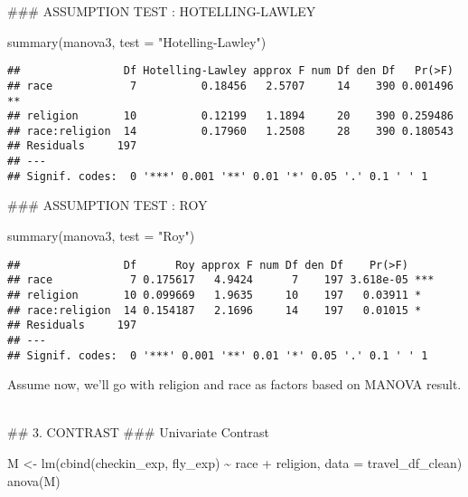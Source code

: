 \documentclass[
]{article}
\newenvironment{Shaded}{\begin{snugshade}}{\end{snugshade}}
\newcommand{\AttributeTok}[1]{\textcolor[rgb]{0.77,0.63,0.00}{#1}}
\newcommand{\FunctionTok}[1]{\textcolor[rgb]{0.00,0.00,0.00}{#1}}
\newcommand{\NormalTok}[1]{#1}
\newcommand{\OtherTok}[1]{\textcolor[rgb]{0.56,0.35,0.01}{#1}}
\newcommand{\SpecialCharTok}[1]{\textcolor[rgb]{0.00,0.00,0.00}{#1}}
\newcommand{\StringTok}[1]{\textcolor[rgb]{0.31,0.60,0.02}{#1}}
\begin{document}
\hfill\break
\#\#\# ASSUMPTION TEST : HOTELLING-LAWLEY

\begin{Shaded}
\begin{Highlighting}[]
\FunctionTok{summary}\NormalTok{(manova3,}
        \AttributeTok{test =} \StringTok{"Hotelling{-}Lawley"}\NormalTok{)}
\end{Highlighting}
\end{Shaded}

\begin{verbatim}
##                Df Hotelling-Lawley approx F num Df den Df   Pr(>F)   
## race            7          0.18456   2.5707     14    390 0.001496 **
## religion       10          0.12199   1.1894     20    390 0.259486   
## race:religion  14          0.17960   1.2508     28    390 0.180543   
## Residuals     197                                                    
## ---
## Signif. codes:  0 '***' 0.001 '**' 0.01 '*' 0.05 '.' 0.1 ' ' 1
\end{verbatim}

\hfill\break
\#\#\# ASSUMPTION TEST : ROY

\begin{Shaded}
\begin{Highlighting}[]
\FunctionTok{summary}\NormalTok{(manova3,}
        \AttributeTok{test =} \StringTok{"Roy"}\NormalTok{)}
\end{Highlighting}
\end{Shaded}

\begin{verbatim}
##                Df      Roy approx F num Df den Df    Pr(>F)    
## race            7 0.175617   4.9424      7    197 3.618e-05 ***
## religion       10 0.099669   1.9635     10    197   0.03911 *  
## race:religion  14 0.154187   2.1696     14    197   0.01015 *  
## Residuals     197                                              
## ---
## Signif. codes:  0 '***' 0.001 '**' 0.01 '*' 0.05 '.' 0.1 ' ' 1
\end{verbatim}

Assume now, we'll go with religion and race as factors based on MANOVA
result.\\
\strut \\
\#\# 3. CONTRAST \#\#\# Univariate Contrast

\begin{Shaded}
\begin{Highlighting}[]
\NormalTok{M }\OtherTok{\textless{}{-}} \FunctionTok{lm}\NormalTok{(}\FunctionTok{cbind}\NormalTok{(checkin\_exp, fly\_exp) }\SpecialCharTok{\textasciitilde{}}\NormalTok{ race }\SpecialCharTok{+}\NormalTok{ religion, }\AttributeTok{data =}\NormalTok{ travel\_df\_clean)}
\FunctionTok{anova}\NormalTok{(M)}
\end{Highlighting}
\end{Shaded}
\end{document}
